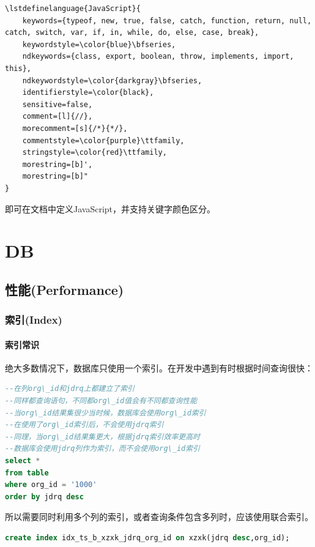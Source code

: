 \documentclass[letter]{book}
\begin{document}
\begin{lstlisting}[language=Tex]
%lstlisting包JavaScript语言设置
\lstdefinelanguage{JavaScript}{
	keywords={typeof, new, true, false, catch, function, return, null, catch, switch, var, if, in, while, do, else, case, break},
	keywordstyle=\color{blue}\bfseries,
	ndkeywords={class, export, boolean, throw, implements, import, this},
	ndkeywordstyle=\color{darkgray}\bfseries,
	identifierstyle=\color{black},
	sensitive=false,
	comment=[l]{//},
	morecomment=[s]{/*}{*/},
	commentstyle=\color{purple}\ttfamily,
	stringstyle=\color{red}\ttfamily,
	morestring=[b]',
	morestring=[b]"
}
\end{lstlisting}

即可在文档中定义JavaScript，并支持关键字颜色区分。

\part{DB}

\chapter{性能(Performance)}

\section{索引(Index)}

\subsection{索引常识}

绝大多数情况下，数据库只使用一个索引。在开发中遇到有时根据时间查询很快：

\begin{lstlisting}[language=SQL]
--在列org\_id和jdrq上都建立了索引
--同样都查询语句，不同都org\_id值会有不同都查询性能
--当org\_id结果集很少当时候，数据库会使用org\_id索引
--在使用了org\_id索引后，不会使用jdrq索引
--同理，当org\_id结果集更大，根据jdrq索引效率更高时
--数据库会使用jdrq列作为索引，而不会使用org\_id索引
select *
from table
where org_id = '1000'
order by jdrq desc
\end{lstlisting}

所以需要同时利用多个列的索引，或者查询条件包含多列时，应该使用联合索引。

\begin{lstlisting}[language=SQL]
create index idx_ts_b_xzxk_jdrq_org_id on xzxk(jdrq desc,org_id);
\end{lstlisting}
\end{document}
